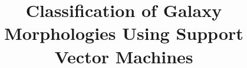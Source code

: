 \documentclass{vldb}
\begin{document}

\title{Classification of Galaxy Morphologies Using {\ttlit Support Vector Machines}}




%
%
%
%

\end{document}
